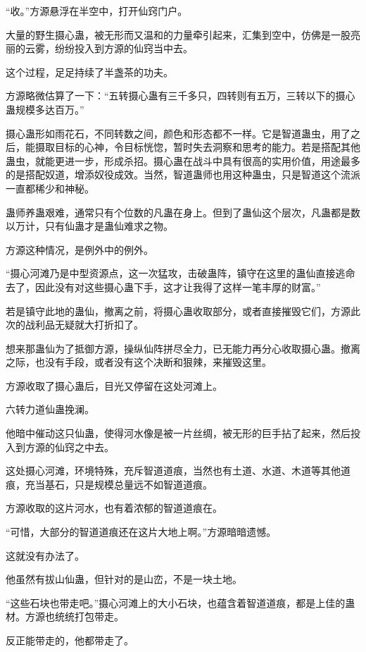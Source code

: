 
\begin{this_body}

“收。”方源悬浮在半空中，打开仙窍门户。

大量的野生摄心蛊，被无形而又温和的力量牵引起来，汇集到空中，仿佛是一股亮丽的云雾，纷纷投入到方源的仙窍当中去。

这个过程，足足持续了半盏茶的功夫。

方源略微估算了一下：“五转摄心蛊有三千多只，四转则有五万，三转以下的摄心蛊规模多达百万。”

摄心蛊形如雨花石，不同转数之间，颜色和形态都不一样。它是智道蛊虫，用了之后，能摄取目标的心神，令目标恍惚，暂时失去洞察和思考的能力。若是搭配其他蛊虫，就能更进一步，形成杀招。摄心蛊在战斗中具有很高的实用价值，用途最多的是搭配奴道，增添奴役成效。当然，智道蛊师也用这种蛊虫，只是智道这个流派一直都稀少和神秘。

蛊师养蛊艰难，通常只有个位数的凡蛊在身上。但到了蛊仙这个层次，凡蛊都是数以万计，只有仙蛊才是蛊仙难求之物。

方源这种情况，是例外中的例外。

“摄心河滩乃是中型资源点，这一次猛攻，击破蛊阵，镇守在这里的蛊仙直接逃命去了，因此没有对这些摄心蛊下手，这才让我得了这样一笔丰厚的财富。”

若是镇守此地的蛊仙，撤离之前，将摄心蛊收取部分，或者直接摧毁它们，方源此次的战利品无疑就大打折扣了。

想来那蛊仙为了抵御方源，操纵仙阵拼尽全力，已无能力再分心收取摄心蛊。撤离之际，也没有手段，或者没有这个决断和狠辣，来摧毁这里。

方源收取了摄心蛊后，目光又停留在这处河滩上。

六转力道仙蛊挽澜。

他暗中催动这只仙蛊，使得河水像是被一片丝绸，被无形的巨手拈了起来，然后投入到方源的仙窍之中去。

这处摄心河滩，环境特殊，充斥智道道痕，当然也有土道、水道、木道等其他道痕，充当基石，只是规模总量远不如智道道痕。

方源收取的这片河水，也有着浓郁的智道道痕在。

“可惜，大部分的智道道痕还在这片大地上啊。”方源暗暗遗憾。

这就没有办法了。

他虽然有拔山仙蛊，但针对的是山峦，不是一块土地。

“这些石块也带走吧。”摄心河滩上的大小石块，也蕴含着智道道痕，都是上佳的蛊材。方源也统统打包带走。

反正能带走的，他都带走了。


\end{this_body}
